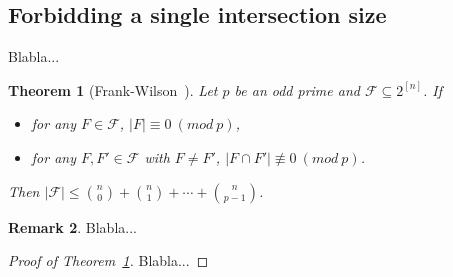 \documentclass{article}
\newtheorem{theorem}{Theorem}[section]
\theoremstyle{definition}
\newtheorem{remark}[theorem]{Remark}
\begin{document}
\subsection{Forbidding a single intersection size}

Blabla...

\begin{theorem}[Frank-Wilson~\cite{frankl1981intersection}]\label{frank wilson}
    Let $p$ be an odd prime and $\mathcal{F}\subseteq 2^{[n]}$. If
    
    \begin{itemize}
        \item for any $F\in \mathcal{F}$, $|F|\equiv 0\ (mod\ p)$,
        \item for any $F,F'\in \mathcal{F}$ with $F\neq F'$, $|F\cap F'|\not\equiv 0\ (mod\ p)$.
    \end{itemize}
    
    Then $|\mathcal{F}|\leq \binom{n}{0}+\binom{n}{1}+\cdots+\binom{n}{p-1}$.
\end{theorem}

\begin{remark}
    Blabla...
\end{remark}

\begin{proof}[Proof of Theorem~\ref{frank wilson}]
    Blabla...
\end{proof}


\newpage


\label{key}
\end{document}
